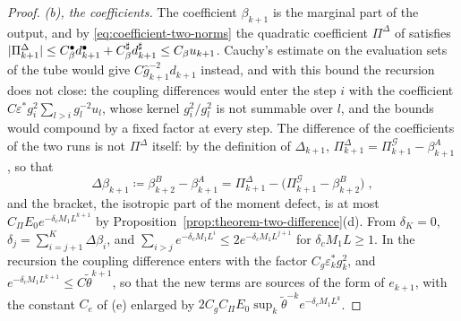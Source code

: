 \documentclass[11pt]{preprint}
\DeclarePairedDelimiter{\abs}{\lvert}{\rvert}
\numberwithin{equation}{section}
\theoremstyle{definition}
\theoremstyle{remark}
\theoremstyle{plain}
\begin{document}
\begin{proof}
\emph{(b), the coefficients.} The coefficient $\beta_{k+1}$ is the marginal part of the output, and by \eqref{eq:coefficient-two-norms} the quadratic coefficient $\Pi^\Delta$ of \cite[(3.61)--(3.64), pp.~282--283]{BalabanCRE} satisfies $\abs{\Pi^\Delta_{k+1}} \leq C^\bullet_\beta d^\bullet_{k+1} + C^\sharp_\beta d^\sharp_{k+1} \leq C_\beta u_{k+1}$. Cauchy's estimate on the evaluation sets of the tube would give $C\hat g_{k+1}^{-2}d_{k+1}$ instead, and with this bound the recursion does not close: the coupling differences would enter the step $i$ with the coefficient $C\varepsilon^*g_i^2\sum_{l>i}g_l^{-2}u_l$, whose kernel $g_i^2/g_l^2$ is not summable over $l$, and the bounds would compound by a fixed factor at every step. The difference of the coefficients of the two runs is not $\Pi^\Delta$ itself: by the definition of $\Delta_{k+1}$, $\Pi^\Delta_{k+1} = \Pi^{\mathcal G}_{k+1} - \beta^A_{k+1}$, so that
\[
    \Delta\beta_{k+1} \coloneqq \beta^B_{k+2} - \beta^A_{k+1} = \Pi^\Delta_{k+1} - \bigl(\Pi^{\mathcal G}_{k+1} - \beta^B_{k+2}\bigr)\;,
\]
and the bracket, the isotropic part of the moment defect, is at most $C_\Pi E_0e^{-\delta_cM_1L^{k+1}}$ by Proposition~\ref{prop:theorem-two-difference}(d). From $\delta_K = 0$, $\delta_j = \sum_{i=j+1}^K\Delta\beta_i$, and $\sum_{i>j}e^{-\delta_cM_1L^i} \leq 2e^{-\delta_cM_1L^{j+1}}$ for $\delta_cM_1L \geq 1$. In the recursion the coupling difference enters with the factor $C_g\varepsilon^*_kg_k^2$, and $e^{-\delta_cM_1L^{k+1}} \leq C\tilde\theta^{k+1}$, so that the new terms are sources of the form of $e_{k+1}$, with the constant $C_e$ of (e) enlarged by $2C_gC_\Pi E_0\sup_k\tilde\theta^{-k}e^{-\delta_cM_1L^k}$.


\end{proof}
\end{document}
